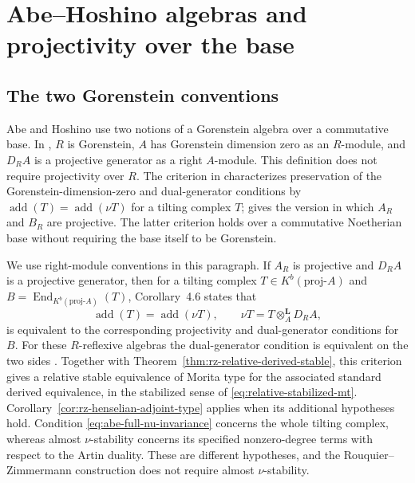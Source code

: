 \documentclass[12pt,a4paper,english,reqno]{amsart}
\numberwithin{equation}{section}
\theoremstyle{plain}
\theoremstyle{definition}
\begin{document}
\appendix
\section{Abe--Hoshino algebras and projectivity over the base}
\label{sec:abe-boundary}
\subsection{The two Gorenstein conventions}

Abe and Hoshino use two notions of a Gorenstein algebra over a
commutative base.  In \cite[Definition~3.1]{AbeHoshino2007}, $R$ is
Gorenstein, $A$ has Gorenstein dimension zero as an $R$-module,
and $D_RA$ is a projective generator as a right $A$-module.
This definition does not require projectivity over $R$.  The
criterion in \cite[Theorem~4.5]{AbeHoshino2007} characterizes
preservation of the Gorenstein-dimension-zero and dual-generator
conditions by
$\operatorname{add}(T)=\operatorname{add}(\nu T)$ for a tilting
complex $T$; \cite[Corollary~4.6]{AbeHoshino2007} gives the
version in which $A_R$ and $B_R$ are projective.  The latter
criterion holds over a commutative Noetherian base without
requiring the base itself to be Gorenstein.

We use right-module conventions in this paragraph.  If $A_R$ is
projective and $D_RA$ is a projective
generator, then for a tilting complex
$T\in K^b(\mathrm{proj}\text{-}A)$ and
$B=\operatorname{End}_{K^b(\mathrm{proj}\text{-}A)}(T)$,
Corollary~4.6 states that
\begin{equation}
 \operatorname{add}(T)=\operatorname{add}(\nu T),
 \qquad \nu T=T\otimes_A^{\mathbf L}D_RA,
 \label{eq:abe-full-nu-invariance}
\end{equation}
is equivalent to the corresponding projectivity and dual-generator
conditions for $B$.  For these $R$-reflexive algebras the
dual-generator condition is equivalent on the two sides
\cite[Remark~3.2]{AbeHoshino2007}.  Together with
Theorem~\ref{thm:rz-relative-derived-stable}, this
criterion gives a relative stable equivalence of Morita type for
the associated standard derived equivalence, in the stabilized
sense of \eqref{eq:relative-stabilized-mt}.
Corollary~\ref{cor:rz-henselian-adjoint-type} applies when its
additional hypotheses hold.  Condition
\eqref{eq:abe-full-nu-invariance} concerns the whole tilting
complex, whereas almost $\nu$-stability concerns its specified
nonzero-degree terms with respect to the Artin duality.  These
are different hypotheses, and the Rouquier--Zimmermann
construction does not require almost $\nu$-stability.
\end{document}
